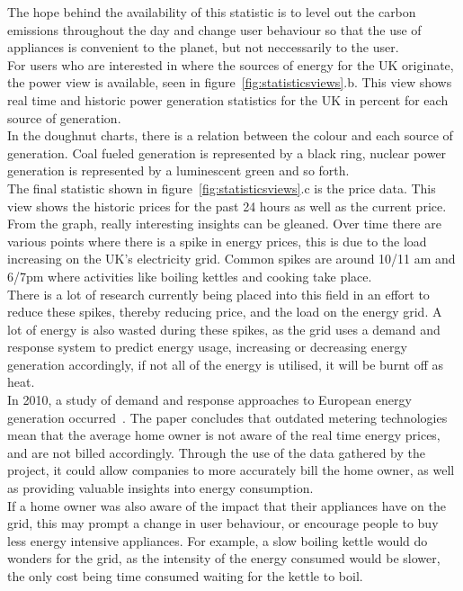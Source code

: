 \documentclass[draft,preprint,12pt,3p]{elsarticle}
\begin{document}
The hope behind the availability of this statistic is to level out the carbon emissions throughout the day and change user behaviour so that the use of appliances is convenient to the planet, but not neccessarily to the user.\\
For users who are interested in where the sources of energy for the UK originate, the power view is available, seen in figure~\ref{fig:statisticsviews}.b. This view shows real time and historic power generation statistics for the UK in percent for each source of generation.\\
In the doughnut charts, there is a relation between the colour and each source of generation. Coal fueled generation is represented by a black ring, nuclear power generation is represented by a luminescent green and so forth.\\
The final statistic shown in figure~\ref{fig:statisticsviews}.c is the price data. This view shows the historic prices for the past 24 hours as well as the current price.\\
From the graph, really interesting insights can be gleaned. Over time there are various points where there is a spike in energy prices, this is due to the load increasing on the UK's electricity grid. Common spikes are around 10/11 am and 6/7pm where activities like boiling kettles and cooking take place.\\
There is a lot of research currently being placed into this field in an effort to reduce these spikes, thereby reducing price, and the load on the energy grid. A lot of energy is also wasted during these spikes, as the grid uses a demand and response system to predict energy usage, increasing or decreasing energy generation accordingly, if not all of the energy is utilised, it will be burnt off as heat.\\
In 2010, a study of demand and response approaches to European energy generation occurred~\cite{demandresponse}. The paper concludes that outdated metering technologies mean that the average home owner  is not aware of the real time energy prices, and are not billed accordingly. Through the use of the data gathered by the project, it could allow companies to more accurately bill the home owner, as well as providing valuable insights into energy consumption.\\
If a home owner was also aware of the impact that their appliances have on the grid, this may prompt a change in user behaviour, or encourage people to buy less energy intensive appliances. For example, a slow boiling kettle would do wonders for the grid, as the intensity of the energy consumed would be slower, the only cost being time consumed waiting for the kettle to boil.
\end{document}
